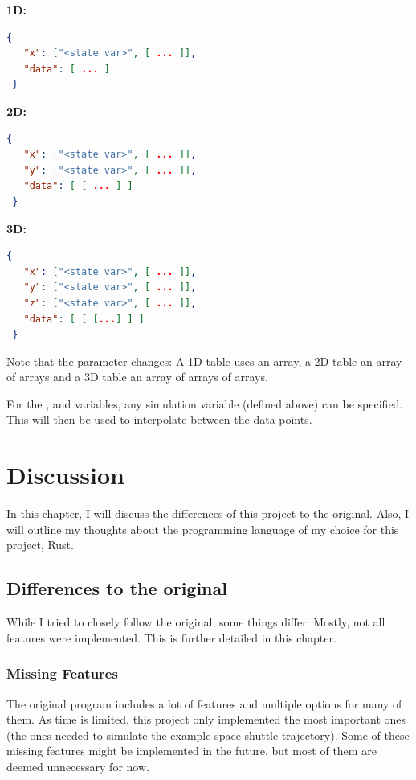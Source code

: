 \textbf{1D:}

\begin{lstlisting}[language=json]
 {
   "x": ["<state var>", [ ... ]],
   "data": [ ... ]
 }
\end{lstlisting}

\textbf{2D:}

\begin{lstlisting}[language=json]
 {
   "x": ["<state var>", [ ... ]],
   "y": ["<state var>", [ ... ]],
   "data": [ [ ... ] ]
 }
\end{lstlisting}

\textbf{3D:}

\begin{lstlisting}[language=json]
 {
   "x": ["<state var>", [ ... ]],
   "y": ["<state var>", [ ... ]],
   "z": ["<state var>", [ ... ]],
   "data": [ [ [...] ] ]
 }
\end{lstlisting}

Note that the  parameter changes: A 1D table uses an array, a 2D table an array
of arrays and a 3D table an array of arrays of arrays.

For the ,  and  variables, any simulation variable (defined above) can be specified.
This will then be used to interpolate between the data points.

\section{Discussion}\label{discussion}

In this chapter, I will discuss the differences of this project to the
original. Also, I will outline my thoughts about the programming language of
my choice for this project, Rust.

\subsection{Differences to the original}\label{differences-to-the-original}

While I tried to closely follow the original, some things differ. Mostly, not
all features were implemented. This is further detailed in this chapter.

\subsubsection{Missing Features}\label{missing-features}

The original program includes a lot of features and multiple options for many
of them. As time is limited, this project only implemented the most important
ones (the ones needed to simulate the example space shuttle trajectory). Some
of these missing features might be implemented in the future, but most of them
are deemed unnecessary for now.

